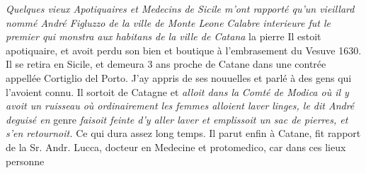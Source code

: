 %
\textit{Quelques vieux Apotiquaires et Medecins de Sicile\protect{} m'ont rapport\'{e} qu'un vieillard nomm\'{e} Andr\'{e} Figluzzo\protect{} de la ville de Monte Leone\protect{}}  \textit{Calabre\protect{} interieure fut le premier qui monstra aux habitans de la ville de Catana}\protect{}%
%
la pierre \protect{}\protect{}
Il estoit apotiquaire, et avoit perdu son bien et boutique \`{a} l'embrasement du Vesuve\protect{} 1630. Il se retira en Sicile\protect{}, et demeura 3 ans proche de Catane\protect{} dans une contr\'{e}e appell\'{e}e Cortiglio del Porto\protect{}. J'ay appris de ses nouuelles et parl\'{e} \`{a} des gens qui l'avoient connu.
Il sortoit de Catagne\protect{}%
%
et \textit{alloit dans la}
\textit{Comt\'{e} de Modica\protect{} o\`{u} il y avoit un ruisseau o\`{u} ordinairement les femmes alloient laver}
\textit{linges, le dit Andr\'{e} deguis\'{e} en} genre \textit{faisoit feinte d'y aller laver et emplissoit un sac de pierres, et s'en retournoit.} %
%
Ce qui dura assez long temps. Il parut enfin \`{a} Catane\protect{}, fit rapport de la  Sr. Andr. Lucca, docteur en Medecine et protomedico, car dans ces lieux personne 
